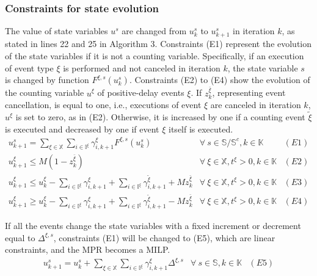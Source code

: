 \documentclass[suppldata]{interact}
\theoremstyle{plain}
\theoremstyle{definition}
\theoremstyle{remark}
\begin{document}
\subsubsection{Constraints for state evolution}\label{sec:const_E}
The value of state variables $u^{s}$ are changed from $u^{s}_{k}$ to $u^{s}_{k+1}$ in iteration $k$, as stated in lines 22 and 25 in Algorithm 3. Constraints (E1) represent the evolution of the state variables if it is not a counting variable. Specifically, if an execution of event type $\xi$ is performed and not canceled in iteration $k$, the state variable $s$ is changed by function $F^{\xi,s}(u^{s}_{k})$. Constraints (E2) to (E4) show the evolution of the counting variable $u^{\xi}$ of positive-delay events ${\xi}$. If $z^{\bar{\xi}}_{k}$, representing event cancellation, is equal to one, i.e., executions of event ${\xi}$ are canceled in iteration $k$, $u^{\xi}$ is set to zero, as in (E2). Otherwise, it is increased by one if a counting event ${\tilde{\xi}}$ is executed and decreased by one if event ${\xi}$ itself is executed.
\begin{eqnarray}
	u^{s}_{k+1} =  \sum_{\xi\in \mathbb{X}} \sum_{i\in \mathbb{I}^{\xi}} \gamma^{\xi}_{i,k+1} F^{\xi,s}(u^s_{k})& \forall\ s\in \mathbb{S}/\mathbb{S}^c,k\in \mathbb{K}&(E1)\nonumber\\
	u^{\xi}_{k+1}\le M(1-z^{\bar{\xi}}_{k}) & \forall\ \xi\in\mathbb{X},t^{\xi}>0,k\in \mathbb{K}&(E2)\nonumber\\
	u^{\xi}_{k+1}\le u^{\xi}_{k} - \sum_{i\in \mathbb{I}^{\xi}} \gamma^{\xi}_{i,k+1} + \sum_{i\in \mathbb{I}^{\xi}} \gamma^{\tilde{\xi}}_{i,k+1} + Mz^{\bar{\xi}}_{k}& \forall\ \xi\in\mathbb{X},t^{\xi}>0, k\in \mathbb{K}&(E3)\nonumber\\
	u^{\xi}_{k+1}\ge u^{\xi}_{k} - \sum_{i\in \mathbb{I}^{\xi}} \gamma^{\xi}_{i,k+1} + \sum_{i\in \mathbb{I}^{\xi}} \gamma^{\tilde{\xi}}_{i,k+1}- Mz^{\bar{\xi}}_{k}& \forall\ \xi\in\mathbb{X},t^{\xi}>0,k\in \mathbb{K}&(E4)\nonumber
\end{eqnarray}

If all the events change the state variables with a fixed increment or decrement equal to $\Delta^{\xi,s}$, constraints (E1) will be changed to (E5), which are linear constraints, and the MPR becomes a MILP. 
\begin{eqnarray}
	u^{s}_{k+1} = u^s_{k} + \sum_{\xi\in \mathbb{X}} \sum_{i\in \mathbb{I}^{\xi}} \gamma^{\xi}_{i,k+1} \Delta^{\xi,s}& \forall\ s\in \mathbb{S},k\in \mathbb{K}&(E5)\nonumber
\end{eqnarray}
\end{document}
